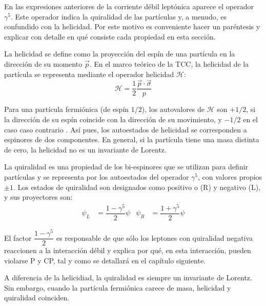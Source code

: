 En las expresiones anteriores de la corriente débil leptónica aparece el operador $\gamma^5$. Este operador indica la quiralidad de las partículas y, a menudo, es confundido con la helicidad. Por este motivo es conveniente hacer un paréntesis y explicar con detalle en qué consiste cada propiedad en esta sección.

La helicidad se define como la proyección del espín de una partícula en la dirección de su momento $\vec{p}$. En el marco teórico de la TCC, la helicidad de la partícula se representa mediante el operador helicidad $\mathcal{H}$:
\begin{equation}
\mathcal{H}=\dfrac{1}{2} \dfrac{\vec{p} \cdot \vec{\sigma}}{p}
\end{equation} 

Para una partícula fermiónica (de espín $1/2$), los autovalores de $\mathcal{H}$ son $+1/2$, si la dirección de su espín coincide con la dirección de su movimiento, y $-1/2$ en el caso caso contrario \cite{Bettini}. Así pues, los autoestados de helicidad se corresponden a espinores de dos componentes. En general, si la partícula tiene una masa distinta de cero, la helicidad no es un invariante de Lorentz.

La quiralidad es una propiedad de los bi-espinores que se utilizan para definir partículas y se representa por los autoestados del operador $\gamma^5$, con valores propios $\pm 1$. Los estados de quiralidad son designados como positivo o (R) y negativo (L), y sus proyectores son:
\begin{align*}
\psi_L &= \dfrac{1-\gamma^5}{2}\psi & \psi_R &= \dfrac{1+\gamma^5}{2}\psi
\end{align*}

El factor $\dfrac{1-\gamma^5}{2}$ es responsable de que sólo los leptones con quiralidad negativa reaccionen a la interacción débil y explica por qué, en esta interacción, pueden violarse P y CP, tal y como se detallará en el capítulo siguiente.

A diferencia de la helicidiad, la quiralidad es siempre un invariante de Lorentz. Sin embargo, cuando la partícula fermiónica carece de masa, helicidad y quiralidad coinciden.
 

